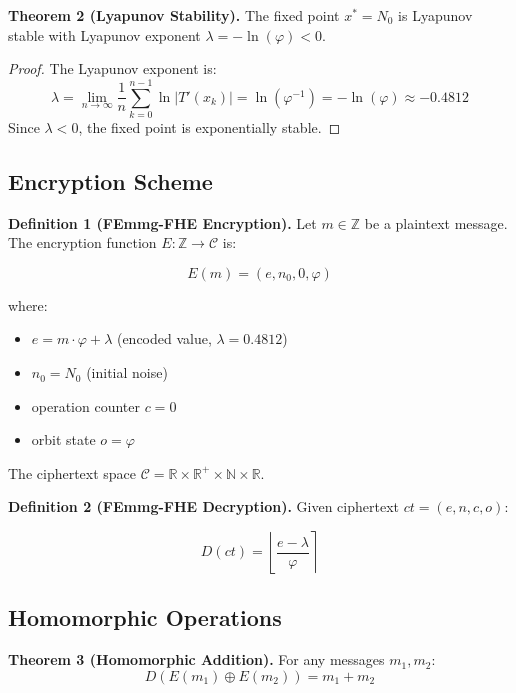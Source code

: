 \documentclass{article}
\begin{document}
\textbf{Theorem 2 (Lyapunov Stability).} The fixed point $x^* = N_0$ is Lyapunov stable with Lyapunov exponent $\lambda = -\ln(\varphi) < 0$.

\begin{proof}
The Lyapunov exponent is:
\begin{equation}
\lambda = \lim_{n \to \infty} \frac{1}{n} \sum_{k=0}^{n-1} \ln|T'(x_k)| = \ln(\varphi^{-1}) = -\ln(\varphi) \approx -0.4812
\end{equation}
Since $\lambda < 0$, the fixed point is exponentially stable.
\end{proof}

\subsection{Encryption Scheme}

\textbf{Definition 1 (FEmmg-FHE Encryption).} Let $m \in \mathbb{Z}$ be a plaintext message. The encryption function $E: \mathbb{Z} \to \mathcal{C}$ is:

\begin{equation}
E(m) = (e, n_0, 0, \varphi)
\end{equation}

where:
\begin{itemize}
    \item $e = m \cdot \varphi + \lambda$ (encoded value, $\lambda = 0.4812$)
    \item $n_0 = N_0$ (initial noise)
    \item operation counter $c = 0$
    \item orbit state $o = \varphi$
\end{itemize}

The ciphertext space $\mathcal{C} = \mathbb{R} \times \mathbb{R}^+ \times \mathbb{N} \times \mathbb{R}$.

\textbf{Definition 2 (FEmmg-FHE Decryption).} Given ciphertext $ct = (e, n, c, o)$:

\begin{equation}
D(ct) = \left\lfloor \frac{e - \lambda}{\varphi} \right\rceil
\end{equation}

\subsection{Homomorphic Operations}

\textbf{Theorem 3 (Homomorphic Addition).} For any messages $m_1, m_2$:
\begin{equation}
D(E(m_1) \oplus E(m_2)) = m_1 + m_2
\end{equation}
\end{document}
